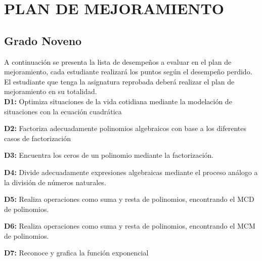\documentclass[spanish,12pt,a4paper]{article}
\begin{document}
	\vspace{0.5cm}
	\section*{PLAN DE MEJORAMIENTO}
	\subsection*{Grado Noveno}
	
	A continuación se presenta la lista de desempeños a evaluar en el plan de mejoramiento, cada estudiante realizará los puntos según el desempeño perdido. El estudiante que tenga la asignatura reprobada deberá realizar el plan de mejoramiento en su totalidad.\\
	
	
	\textbf{D1:} Optimiza situaciones de la vida cotidiana mediante la modelación de situaciones con la ecuación cuadrática
	
	\textbf{D2:} Factoriza adecuadamente polinomios algebraicos con base a los diferentes casos de factorización
	
	\textbf{D3:} Encuentra los ceros de un polinomio mediante la factorización.
	
	\textbf{D4:} Divide adecuadamente expresiones algebraicas mediante el proceso análogo a la división de números naturales.
	
	\textbf{D5:} Realiza operaciones como suma y resta de polinomios, encontrando el MCD de polinomios.
	
	\textbf{D6:} Realiza operaciones como suma y resta de polinomios, encontrando el MCM de polinomios.
	
	\textbf{D7:} Reconoce y grafica la función exponencial
	

	
	
	\vspace{1cm}
	
\end{document}
